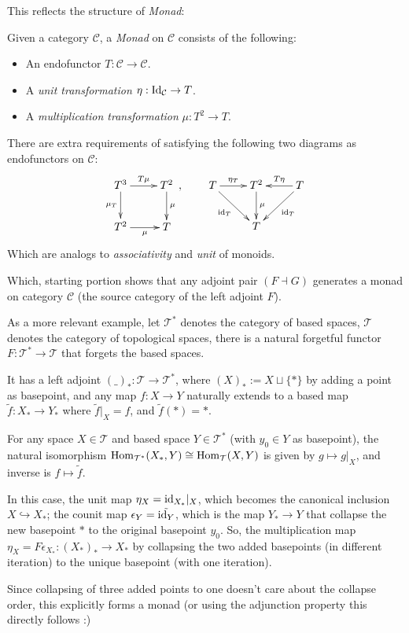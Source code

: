 \documentclass{article}
\begin{document}
This reflects the structure of \emph{Monad}:
\begin{defn}
    Given a category $\mathcal{C}$, a \emph{Monad} on $\mathcal{C}$ consists of the following:
    \begin{itemize}
        \item An endofunctor $T:\mathcal{C}\rightarrow\mathcal{C}$.
        \item A \emph{unit transformation} $\eta:\mathrm{Id}_\mathcal{C}\rightarrow T$.
        \item A \emph{multiplication transformation} $\mu:T^2\rightarrow T$.
    \end{itemize}
    There are extra requirements of satisfying the following two diagrams as endofunctors on $\mathcal{C}$:
    \[\xymatrix{
        T^3 \ar[d]_-{\mu_{T}} \ar[r]^-{T\mu} & T^2\ar[d]^-{\mu}\\
        T^2 \ar[r]_-{\mu} & T
    },\quad\quad \xymatrix{
        T \ar[dr]_-{\id_{T}} \ar[r]^-{\eta_{T}} & T^2 \ar[d]^-{\mu} & T \ar[l]_-{T\eta} \ar[dl]^-{\id_{T}}\\
        & T
    }\]
    Which are analogs to \emph{associativity} and \emph{unit} of monoids.
\end{defn}

Which, starting portion shows that any adjoint pair $(F\dashv G)$ generates a monad on category $\mathcal{C}$ (the source category of the left adjoint $F$).

\begin{exmp}
    As a more relevant example, let $\mathcal{T}^*$ denotes the category of based spaces, $\mathcal{T}$ denotes the category of topological spaces, there is a natural forgetful functor $F:\mathcal{T}^*\rightarrow \mathcal{T}$ that forgets the based spaces.

    It has a left adjoint $(\_)_*:\mathcal{T}\rightarrow\mathcal{T}^*$, where $(X)_* := X\sqcup \{*\}$ by adding a point as basepoint, and any map $f:X\rightarrow Y$ naturally extends to a based map $\tilde{f}:X_*\rightarrow Y_*$ where $\tilde{f}|_X = f$, and $\tilde{f}(*)=*$.

    For any space $X\in\mathcal{T}$ and based space $Y\in\mathcal{T}^*$ (with $y_0\in Y$ as basepoint), the natural isomorphism $\mathrm{Hom}_{\mathcal{T}^*}(X_*, Y)\cong \mathrm{Hom}_\mathcal{T}(X,Y)$ is given by $g\mapsto g|_X$, and inverse is $f\mapsto \tilde{f}$.

    \hfil

    In this case, the unit map $\eta_X = \mathrm{id}_{X_*}|_X$, which becomes the canonical inclusion $X\hookrightarrow X_*$; the counit map $\epsilon_Y = \tilde{\mathrm{id}_Y}$, which is the map $Y_*\rightarrow Y$ that collapse the new basepoint $*$ to the original basepoint $y_0$. So, the multiplication map $\eta_X = F\epsilon_{X_*}:(X_*)_*\rightarrow X_*$ by collapsing the two added basepoints (in different iteration) to the unique basepoint (with one iteration).

    Since collapsing of three added points to one doesn't care about the collapse order, this explicitly forms a monad (or using the adjunction property this directly follows :)
\end{exmp}
\end{document}
